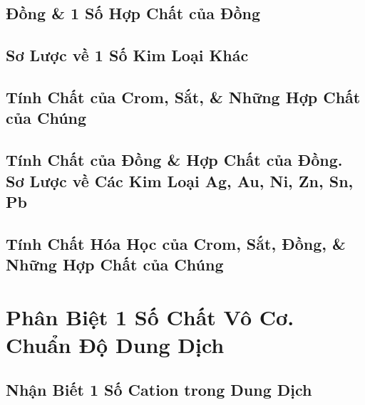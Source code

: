 \documentclass{article}
\numberwithin{equation}{section}
\begin{document}

\subsection{Đồng \& 1 Số Hợp Chất của Đồng}


\subsection{Sơ Lược về 1 Số Kim Loại Khác}


\subsection{Tính Chất của Crom, Sắt, \& Những Hợp Chất của Chúng}


\subsection{Tính Chất của Đồng \& Hợp Chất của Đồng. Sơ Lược về Các Kim Loại Ag, Au, Ni, Zn, Sn, Pb}


\subsection{Tính Chất Hóa Học của Crom, Sắt, Đồng, \& Những Hợp Chất của Chúng}


\section{Phân Biệt 1 Số Chất Vô Cơ. Chuẩn Độ Dung Dịch}

\subsection{Nhận Biết 1 Số Cation trong Dung Dịch}

\end{document}

